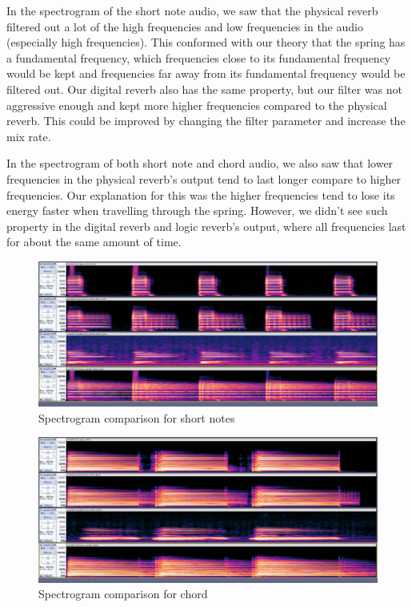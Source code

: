 \documentclass[12pt]{article}
\begin{document}
In the spectrogram of the short note audio, we saw that the physical reverb filtered out a lot of the high frequencies and low frequencies in the audio (especially high frequencies). This conformed with our theory that the spring has a fundamental frequency, which frequencies close to its fundamental frequency would be kept and frequencies far away from its fundamental frequency would be filtered out. Our digital reverb also has the same property, but our filter was not aggressive enough and kept more higher frequencies compared to the physical reverb. This could be improved by changing the filter parameter and increase the mix rate.

In the spectrogram of both short note and chord audio, we also saw that lower frequencies in the physical reverb's output tend to last longer compare to higher frequencies. Our explanation for this was the higher frequencies tend to lose its energy faster when travelling through the spring. However, we didn't see such property in the digital reverb and logic reverb's output, where all frequencies last for about the same amount of time.

\begin{figure}[h]
	\center
	\includegraphics[width=0.95\linewidth]{audio_comparison/short_note_comparison_spec.png}
	\caption{Spectrogram comparison for short notes}
\end{figure}

\begin{figure}[h]
	\center
	\includegraphics[width=0.95\linewidth]{audio_comparison/chord_comparison_spec.png}
	\caption{Spectrogram comparison for chord}
\end{figure}
\end{document}
